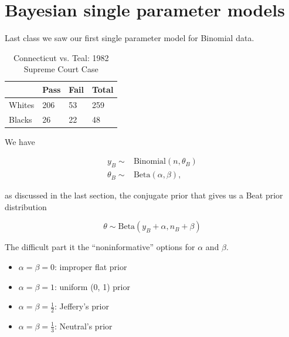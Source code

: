 \section{Bayesian single parameter models}

Last class we saw our first single parameter model for Binomial data.

\begin{table}[ht]
\centering
\begin{tabular}{@{}llll@{}}
\toprule
       & Pass & Fail & Total \\ \midrule
Whites & 206  & 53   & 259   \\
Blacks & 26   & 22   & 48    \\ \bottomrule
\end{tabular}
\caption{Connecticut vs. Teal: 1982 Supreme Court Case}
\end{table}

We have

\begin{align*}
    y_B \sim& \text{Binomial}(n, \theta_B)\\
    \theta_B \sim& \text{Beta}(\alpha, \beta),
\end{align*}

as discussed in the last section, the conjugate prior that gives us a Beat prior distribution 

\[
\theta \sim \text{Beta}(y_B + \alpha, n_B + \beta)
\]

The difficult part it the ``noninformative'' options for $\alpha$ and $\beta$.

\begin{itemize}
    \item $\alpha = \beta = 0$: improper flat prior
    \item $\alpha = \beta = 1$: uniform (0, 1) prior
    \item $\alpha = \beta = \frac{1}{2}$: Jeffery's prior
    \item $\alpha = \beta = \frac{1}{3}$: Neutral's prior
\end{itemize}

